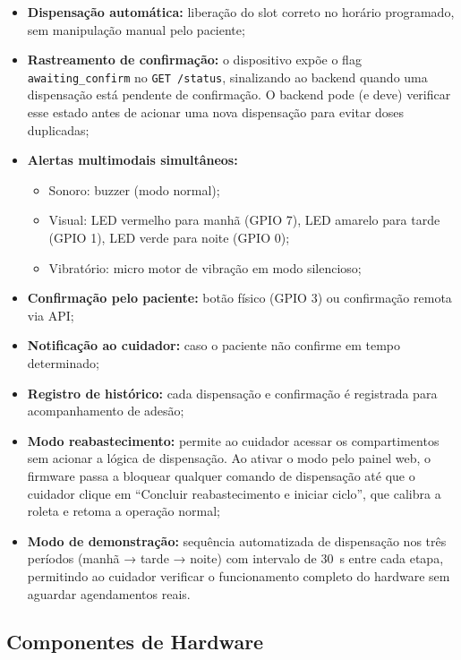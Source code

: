 \documentclass[12pt,a4paper]{article}
\begin{document}
\begin{itemize}
    \item \textbf{Dispensação automática:} liberação do slot correto no horário programado, sem manipulação manual pelo paciente;
    \item \textbf{Rastreamento de confirmação:} o dispositivo expõe o flag \texttt{awaiting\_confirm} no \texttt{GET /status}, sinalizando ao backend quando uma dispensação está pendente de confirmação. O backend pode (e deve) verificar esse estado antes de acionar uma nova dispensação para evitar doses duplicadas;
    \item \textbf{Alertas multimodais simultâneos:}
        \begin{itemize}
            \item Sonoro: buzzer (modo normal);
            \item Visual: LED vermelho para manhã (GPIO 7), LED amarelo para tarde (GPIO 1), LED verde para noite (GPIO 0);
            \item Vibratório: micro motor de vibração em modo silencioso;
        \end{itemize}
    \item \textbf{Confirmação pelo paciente:} botão físico (GPIO 3) ou confirmação remota via API;
    \item \textbf{Notificação ao cuidador:} caso o paciente não confirme em tempo determinado;
    \item \textbf{Registro de histórico:} cada dispensação e confirmação é registrada para acompanhamento de adesão;
    \item \textbf{Modo reabastecimento:} permite ao cuidador acessar os compartimentos sem acionar a lógica de dispensação. Ao ativar o modo pelo painel web, o firmware passa a bloquear qualquer comando de dispensação até que o cuidador clique em ``Concluir reabastecimento e iniciar ciclo'', que calibra a roleta e retoma a operação normal;
    \item \textbf{Modo de demonstração:} sequência automatizada de dispensação nos três períodos (manhã → tarde → noite) com intervalo de 30~s entre cada etapa, permitindo ao cuidador verificar o funcionamento completo do hardware sem aguardar agendamentos reais.
\end{itemize}

\subsection{Componentes de Hardware}
\end{document}
